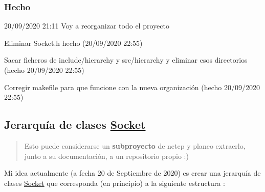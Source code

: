\subsubsection*{Hecho}


\begin{DoxyItemize}
\item 20/09/2020 21\+:11 Voy a reorganizar todo el proyecto
\begin{DoxyItemize}
\item Eliminar Socket.\+h hecho (20/09/2020 22\+:55)
\item Sacar ficheros de include/hierarchy y src/hierarchy y eliminar esos directorios (hecho 20/09/2020 22\+:55)
\item Corregir makefile para que funcione con la nueva organización (hecho 20/09/2020 22\+:55)
\end{DoxyItemize}
\end{DoxyItemize}

\subsection*{Jerarquía de clases \hyperlink{classSocket}{Socket}}

\begin{quote}
Esto puede considerarse un {\bfseries subproyecto} de {\ttfamily netcp} y planeo extraerlo, junto a su documentación, a un repositorio propio \+:)~\newline
~\newline
 \end{quote}
Mi idea actualmente (a fecha 20 de Septiembre de 2020) es crear una jerarquía de clases \hyperlink{classSocket}{Socket} que corresponda (en principio) a la siguiente estructura \+:


